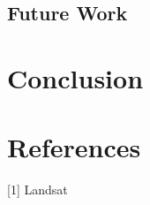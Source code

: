 \documentclass[10pt]{article}
\begin{document}
\subsection{Future Work}


\section{Conclusion}






\section*{References}

\small

[1]  Landsat
\end{document}
